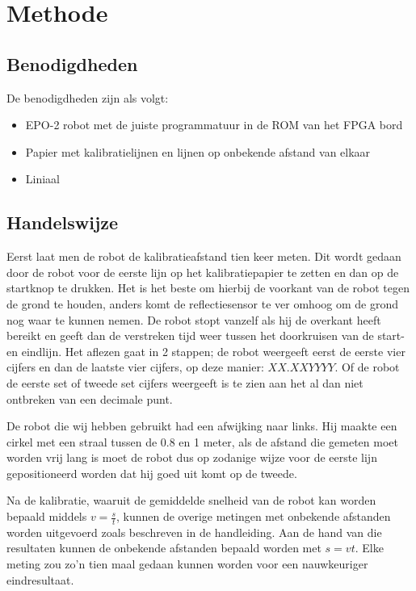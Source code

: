 \documentclass{report}
\begin{document}
\chapter{Methode}
\section{Benodigdheden}
De benodigdheden zijn als volgt:
\begin{itemize}
\item EPO-2 robot met de juiste programmatuur in de ROM van het FPGA bord
\item Papier met kalibratielijnen en lijnen op onbekende afstand van elkaar
\item Liniaal
\end{itemize}
\section{Handelswijze}
Eerst laat men de robot de kalibratieafstand tien keer meten. Dit wordt gedaan door de robot voor de eerste lijn op het kalibratiepapier te zetten en dan op de startknop te drukken. Het is het beste om hierbij de voorkant van de robot tegen de grond te houden, anders komt de reflectiesensor te ver omhoog om de grond nog waar te kunnen nemen. De robot stopt vanzelf als hij de overkant heeft bereikt en geeft dan de verstreken tijd weer tussen het doorkruisen van de start- en eindlijn. Het aflezen gaat in 2 stappen; de robot weergeeft eerst de eerste vier cijfers en dan de laatste vier cijfers, op deze manier: $XX.XXYYYY$. Of de robot de eerste set of tweede set cijfers weergeeft is te zien aan het al dan niet ontbreken van een decimale punt. 

De robot die wij hebben gebruikt had een afwijking naar links. Hij maakte een cirkel met een straal tussen de 0.8 en 1 meter, als de afstand die gemeten moet worden vrij lang is moet de robot dus op zodanige wijze voor de eerste lijn gepositioneerd worden dat hij goed uit komt op de tweede.

Na de kalibratie, waaruit de gemiddelde snelheid van de robot kan worden bepaald middels $v=\frac{s}{t}$, kunnen de overige metingen met onbekende afstanden worden uitgevoerd zoals beschreven in de handleiding. Aan de hand van die resultaten kunnen de onbekende afstanden bepaald worden met $s=vt$. Elke meting zou zo'n tien maal gedaan kunnen worden voor een nauwkeuriger eindresultaat.
\end{document}
